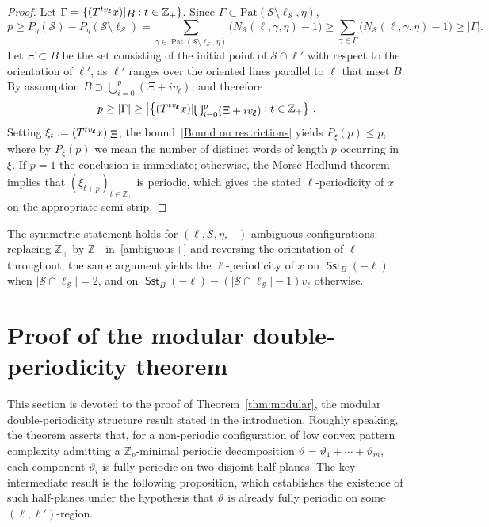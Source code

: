 \documentclass[12pt]{amsart}
\numberwithin{equation}{section}
\DeclareMathOperator{\pat}{Pat}
\DeclareMathOperator{\sst}{\mathsf{Sst}}
\newcommand{\bb}[1]{\mathbb{#1}}
\newcommand{\sob}[1]{\ensuremath{{\mathbin |}\raise-.4ex\hbox{$#1$}}}
\begin{document}
\begin{proof}
Let $\Gamma = \{(T^{t v_{\pmb{\ell}}}x)\sob{B} : t \in \mathbb{Z}_+\}$. Since $\Gamma \subset \mathrm{Pat}(\mathcal{S} \setminus \pmb{\ell}_{\mathcal{S}},\eta)$, 
\[
p \geq P_{\eta}(\mathcal{S})-P_{\eta}(\mathcal{S} \setminus \pmb{\ell}_{\mathcal{S}}) = \sum_{\gamma \in \pat(\mathcal{S} \setminus \pmb{\ell}_{\mathcal{S}},\eta)} \bigl(N_{\mathcal{S}}(\pmb{\ell},\gamma,\eta)-1\bigr) \geq \sum_{\gamma \in \Gamma} \bigl(N_{\mathcal{S}}(\pmb{\ell},\gamma,\eta)-1\bigr) \geq |\Gamma|.
\] 
Let $\Xi \subset B$ be the set consisting of the initial point of $\mathcal{S} \cap \pmb{\ell}'$ with respect to the orientation of $\pmb{\ell}'$, as $\pmb{\ell}'$ ranges over the oriented lines parallel to $\pmb{\ell}$ that meet $B$. By assumption $B \supset \bigcup_{i=0}^{p} (\Xi + i v_{\pmb{\ell}}) $, and therefore 
\begin{equation}\label{Bound on restrictions}
		p \geq |\Gamma| \geq \big|\big\{ (T^{t v_{\pmb{\ell}}}x)\sob{\bigcup_{i=0}^{p}(\Xi+i v_{\pmb{\ell}})} : t \in \bb{Z}_+\big\}\big|.
	\end{equation}
Setting $\xi_t := (T^{t v_{\pmb{\ell}}}x)\sob{\Xi}$, the bound~\eqref{Bound on restrictions} yields $P_{\xi}(p)\leq p$, where by $P_{\xi}(p)$ we mean the number of distinct words of length $p$ occurring in $\xi$. If $p = 1$ the conclusion is immediate; otherwise, the Morse-Hedlund theorem \cite{MorseHedlund38,MorseHedlund42} implies that $ (\xi_{t+p})_{t \in \bb{Z}_+} $ is periodic, which gives the stated $\ell$-periodicity of $ x $ on the appropriate semi-strip.
\end{proof}

The symmetric statement holds for $(\pmb{\ell}, \mathcal S, \eta, -)$-ambiguous configurations: replacing $\mathbb Z_+$ by $\mathbb Z_-$ in~\eqref{ambiguous+} and reversing the orientation of $\pmb{\ell}$ throughout, the same argument yields the $\ell$-periodicity of $x$ on $\sst_{B}(-\pmb{\ell})$ when $|\mathcal S \cap \pmb{\ell}_{\mathcal S}| = 2 $, and on $\sst_{B}(-\pmb{\ell}) - (|\mathcal S \cap \pmb{\ell}_{\mathcal S}|-1) v_{\pmb{\ell}}$ otherwise.

\section{Proof of the modular double-periodicity theorem}
\label{sec:modular}

This section is devoted to the proof of Theorem~\ref{thm:modular}, the modular double-periodicity structure result stated in the introduction. Roughly speaking, the theorem asserts that, for a non-periodic configuration of  low convex pattern complexity admitting a $\mathbb Z_p$-minimal periodic decomposition $ \vartheta = \vartheta_1 + \cdots + \vartheta_m $, each component $ \vartheta_i $ is fully periodic on two disjoint half-planes. The key intermediate result is the following proposition, which establishes the existence of such half-planes under the hypothesis that $ \vartheta $ is already fully periodic on some $ (\pmb{\ell}, \pmb{\ell}')$-region.
\end{document}

